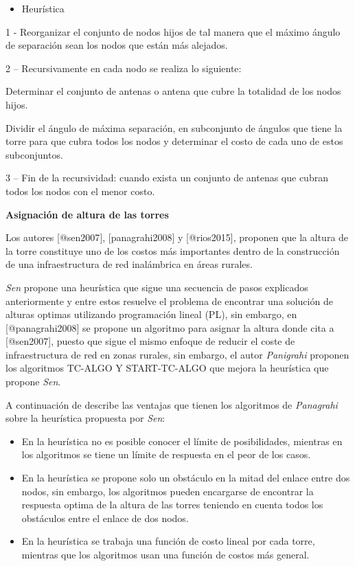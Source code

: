 \documentclass[]{article}
\providecommand{\tightlist}{%
  \setlength{\itemsep}{0pt}\setlength{\parskip}{0pt}}
\begin{document}
\begin{itemize}
\tightlist
\item
  Heurística
\end{itemize}

1 - Reorganizar el conjunto de nodos hijos de tal manera que el máximo
ángulo de separación sean los nodos que están más alejados.

2 -- Recursivamente en cada nodo se realiza lo siguiente:

Determinar el conjunto de antenas o antena que cubre la totalidad de los
nodos hijos.

Dividir el ángulo de máxima separación, en subconjunto de ángulos que
tiene la torre para que cubra todos los nodos y determinar el costo de
cada uno de estos subconjuntos.

3 -- Fin de la recursividad: cuando exista un conjunto de antenas que
cubran todos los nodos con el menor costo.

\textbf{Asignación de altura de las torres}

Los autores {[}@sen2007{]}, {[}panagrahi2008{]} y {[}@rios2015{]},
proponen que la altura de la torre constituye uno de los costos más
importantes dentro de la construcción de una infraestructura de red
inalámbrica en áreas rurales.

\emph{Sen} propone una heurística que sigue una secuencia de pasos
explicados anteriormente y entre estos resuelve el problema de encontrar
una solución de alturas optimas utilizando programación lineal (PL), sin
embargo, en {[}@panagrahi2008{]} se propone un algoritmo para asignar la
altura donde cita a {[}@sen2007{]}, puesto que sigue el mismo enfoque de
reducir el coste de infraestructura de red en zonas rurales, sin
embargo, el autor \emph{Panigrahi} proponen los algoritmos TC-ALGO Y
START-TC-ALGO que mejora la heurística que propone \emph{Sen}.

A continuación de describe las ventajas que tienen los algoritmos de
\emph{Panagrahi} sobre la heurística propuesta por \emph{Sen}:

\begin{itemize}
\item
  En la heurística no es posible conocer el límite de posibilidades,
  mientras en los algoritmos se tiene un límite de respuesta en el peor
  de los casos.
\item
  En la heurística se propone solo un obstáculo en la mitad del enlace
  entre dos nodos, sin embargo, los algoritmos pueden encargarse de
  encontrar la respuesta optima de la altura de las torres teniendo en
  cuenta todos los obstáculos entre el enlace de dos nodos.
\item
  En la heurística se trabaja una función de costo lineal por cada
  torre, mientras que los algoritmos usan una función de costos más
  general.
\end{itemize}
\end{document}
